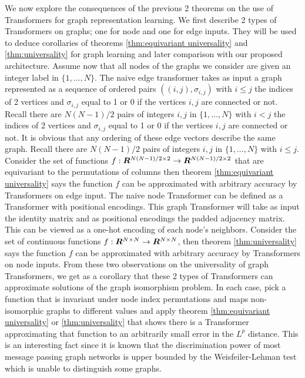 \documentclass{article}
\begin{document}
We now explore the consequences of the previous 2 theorems on the use of Transformers for graph representation learning. We first describe 2 types of Transformers on graphs; one for node and one for edge inputs. They will be used to deduce corollaries of theorems \ref{thm:equivariant universality} and \ref{thm:universality} for graph learning and later comparison with our proposed architecture. Assume now that all nodes of the graphs we consider are given an integer label in $\{1,...,N\}$.
\newline\newline
The naive edge transformer takes as input a graph represented as a sequence of ordered pairs $((i,j),\sigma_{i,j})$ with $i\leq j$ the indices of 2 vertices and $\sigma_{i,j}$ equal to 1 or 0 if the vertices $i,j$ are connected or not. Recall there are $N(N-1)/2$ pairs of integers $i,j$ in $\{1,...,N\}$ with $i < j$ the indices of 2 vertices and $\sigma_{i,j}$ equal to 1 or 0 if the vertices $i,j$ are connected or not. It is obvious that any ordering of these edge vectors describe the same graph. Recall there are $N(N-1)/2$ pairs of integers $i,j$ in $\{1,...,N\}$ with $i\leq j$. Consider the set of functions $f: {\bm{R}}^{N (N-1)/2 \times 2} \to {\bm{R}}^{N (N-1)/2 \times 2}$ that are equivariant to the permutations of columns then theorem \ref{thm:equivariant universality} says the function $f$ can be approximated with arbitrary accuracy by Transformers on edge input.
\newline\newline
The naive node Transformer can be defined as a Transformer with positional encodings. This graph Transformer will take as input the identity matrix and as positional encodings the padded adjacency matrix. This can be viewed as a one-hot encoding of each node's neighbors. Consider the set of continuous functions $f:{\bm{R}}^{N\times N} \to {\bm{R}}^{N\times N}$, then theorem \ref{thm:universality} says the function $f$ can be approximated with arbitrary accuracy by Transformers on node inputs.
\newline\newline
From these two observations on the universality of graph Transformers, we get as a corollary that these 2 types of Transformers can approximate solutions of the graph isomorphism problem. In each case, pick a function that is invariant under node index permutations and maps non-isomorphic graphs to different values and apply theorem \ref{thm:equivariant universality} or \ref{thm:universality} that shows there is a Transformer approximating that function to an arbitrarily small error in the $L^p$ distance. This is an interesting fact since it is known that the discrimination power of most message passing graph networks is upper bounded by the Weisfeiler-Lehman test which is unable to distinguish some graphs.
\end{document}
